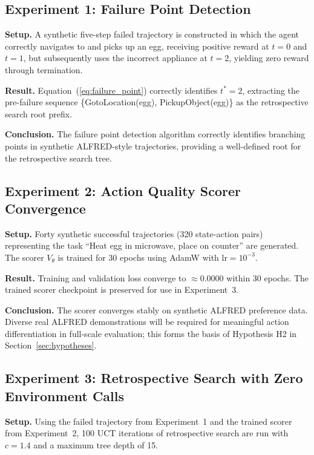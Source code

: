 \documentclass[pdflatex,sn-mathphys-num]{sn-jnl}
\theoremstyle{thmstyleone}
\theoremstyle{thmstyletwo}
\theoremstyle{thmstylethree}
\newcommand{\Vtheta}{V_{\!\theta}}
\begin{document}
\FloatBarrier
\subsection{Experiment 1: Failure Point Detection}

\textbf{Setup.}
A synthetic five-step failed trajectory is constructed in which the
agent correctly navigates to and picks up an egg, receiving positive
reward at $t=0$ and $t=1$, but subsequently uses the incorrect
appliance at $t=2$, yielding zero reward through termination.

\textbf{Result.}
Equation~(\ref{eq:failure_point}) correctly identifies $t^*=2$,
extracting the pre-failure sequence
\{GotoLocation(egg), PickupObject(egg)\} as the retrospective search
root prefix.

\textbf{Conclusion.}
The failure point detection algorithm correctly identifies branching
points in synthetic ALFRED-style trajectories, providing a well-defined
root for the retrospective search tree.

\FloatBarrier
\subsection{Experiment 2: Action Quality Scorer Convergence}

\textbf{Setup.}
Forty synthetic successful trajectories (320 state-action pairs)
representing the task ``Heat egg in microwave, place on counter'' are
generated. The scorer $\Vtheta$ is trained for 30 epochs using AdamW
with $\text{lr}=10^{-3}$.

\textbf{Result.}
Training and validation loss converge to $\approx0.0000$ within 30
epochs. The trained scorer checkpoint is preserved for use in
Experiment~3.

\textbf{Conclusion.}
The scorer converges stably on synthetic ALFRED preference data.
Diverse real ALFRED demonstrations will be required for meaningful
action differentiation in full-scale evaluation; this forms the basis
of Hypothesis H2 in Section~\ref{sec:hypotheses}.

\FloatBarrier
\subsection{Experiment 3: Retrospective Search with Zero Environment
Calls}

\textbf{Setup.}
Using the failed trajectory from Experiment~1 and the trained scorer
from Experiment~2, 100 UCT iterations of retrospective search are run
with $c=1.4$ and a maximum tree depth of 15.
\end{document}
